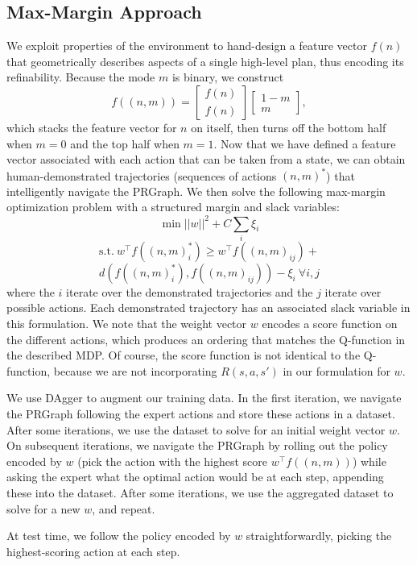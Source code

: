 \subsection{Max-Margin Approach}
We exploit properties of the environment to hand-design a feature vector $f(n)$ that geometrically
describes aspects of a single high-level plan, thus encoding its refinability. Because the mode $m$ is binary,
we construct $$f((n, m)) = \begin{bmatrix} f(n) \\ f(n) \end{bmatrix} \begin{bmatrix} 1 - m \\ m \end{bmatrix},$$
which stacks the feature vector for $n$ on itself, then turns off the bottom half when $m = 0$ and the
top half when $m = 1$. Now that we have defined a feature vector associated with each action that can be taken
from a state, we can obtain human-demonstrated trajectories (sequences of actions $(n, m)^{*}$) that intelligently
navigate the PRGraph. We then solve the following max-margin optimization problem with a structured margin and slack variables:
$$\min ||w||^{2} + C\sum_{i} \xi_{i}$$
$$\text{s.t.}\ w^{\top}f((n, m)_{i}^{*}) \geq w^{\top}f((n, m)_{ij}) + $$
$$d(f((n, m)_{i}^{*}), f((n, m)_{ij})) - \xi_{i}\ \forall i, j$$
where the $i$ iterate over the demonstrated trajectories and the $j$ iterate over possible actions. Each
demonstrated trajectory has an associated slack variable in this formulation.
We note that the weight vector $w$ encodes a score function on the different actions, which produces
an ordering that matches the Q-function in the described MDP. Of course, the score function is not identical
to the Q-function, because we are not incorporating $R(s, a, s')$ in our formulation for $w$.

We use DAgger to augment our training data. In the first iteration, we navigate the PRGraph following
the expert actions and store these actions in a dataset. After some iterations, we use the dataset to solve for an
initial weight vector $w$. On subsequent iterations, we navigate the PRGraph by rolling out the policy
encoded by $w$ (pick the action with the highest score $w^{\top}f((n, m))$) while asking the expert what
the optimal action would be at each step, appending these into the dataset. After some iterations, we use the
aggregated dataset to solve for a new $w$, and repeat.

At test time, we follow the policy encoded by $w$ straightforwardly, picking the highest-scoring action
at each step.
